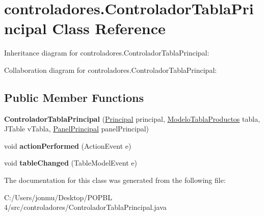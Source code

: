 \hypertarget{classcontroladores_1_1_controlador_tabla_principal}{}\section{controladores.\+Controlador\+Tabla\+Principal Class Reference}
\label{classcontroladores_1_1_controlador_tabla_principal}


Inheritance diagram for controladores.\+Controlador\+Tabla\+Principal\+:


Collaboration diagram for controladores.\+Controlador\+Tabla\+Principal\+:
\subsection*{Public Member Functions}
\begin{DoxyCompactItemize}
\item 
\mbox{\label{classcontroladores_1_1_controlador_tabla_principal_a279325fa05462ea55845646a812d9a84}} 
{\bfseries Controlador\+Tabla\+Principal} (\mbox{\hyperlink{classvistas_1_1_principal}{Principal}} principal, \mbox{\hyperlink{classmodelos_1_1_modelo_tabla_productos}{Modelo\+Tabla\+Productos}} tabla, J\+Table v\+Tabla, \mbox{\hyperlink{classpaneles_1_1_panel_principal}{Panel\+Principal}} panel\+Principal)
\item 
\mbox{\label{classcontroladores_1_1_controlador_tabla_principal_a7ccd2cb9c153dbdd5d572be6d7a7aa5f}} 
void {\bfseries action\+Performed} (Action\+Event e)
\item 
\mbox{\label{classcontroladores_1_1_controlador_tabla_principal_af223db673a317026cd0ce727b661fdea}} 
void {\bfseries table\+Changed} (Table\+Model\+Event e)
\end{DoxyCompactItemize}


The documentation for this class was generated from the following file\+:\begin{DoxyCompactItemize}
\item 
C\+:/\+Users/jonmu/\+Desktop/\+P\+O\+P\+B\+L 4/src/controladores/Controlador\+Tabla\+Principal.\+java\end{DoxyCompactItemize}
